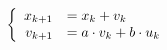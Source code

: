 \documentclass{article}
\begin{document}
\thispagestyle{empty}


$$
\left \{ \begin{array}{r l}
x_{k+1} & = x_k + v_k\\
v_{k+1} & = a\cdot v_k + b \cdot u_k
\end{array} \right.
$$
\end{document}
